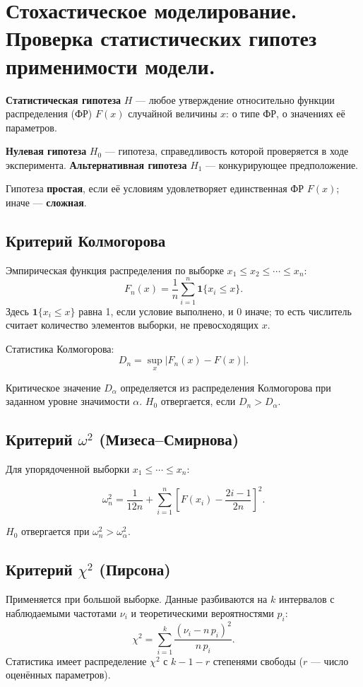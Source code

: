 \section{Стохастическое моделирование. Проверка статистических гипотез применимости модели.}

\textbf{Статистическая гипотеза} $H$ — любое утверждение относительно функции распределения (ФР) $F(x)$ случайной величины $x$: о типе ФР, о значениях её параметров.

\textbf{Нулевая гипотеза} $H_0$ — гипотеза, справедливость которой проверяется в ходе эксперимента.
\textbf{Альтернативная гипотеза} $H_1$ — конкурирующее предположение.

Гипотеза \textbf{простая}, если её условиям удовлетворяет единственная ФР $F(x)$; иначе — \textbf{сложная}.

\subsection*{Критерий Колмогорова}

Эмпирическая функция распределения по выборке $x_1 \leqslant x_2 \leqslant \cdots \leqslant x_n$:
\[
  F_n(x) = \frac{1}{n}\sum_{i=1}^n \mathbf{1}\{x_i \leqslant x\}.
\]
Здесь $\mathbf{1}\{x_i \leqslant x\}$ равна 1, если условие выполнено, и 0 иначе; то есть числитель считает количество элементов выборки, не превосходящих $x$.

Статистика Колмогорова:
\[
  D_n = \sup_x \bigl|F_n(x) - F(x)\bigr|.
\]

Критическое значение $D_\alpha$ определяется из распределения Колмогорова при заданном уровне значимости $\alpha$. $H_0$ отвергается, если $D_n > D_\alpha$.

\subsection*{Критерий $\omega^2$ (Мизеса–Смирнова)}

Для упорядоченной выборки $x_1 \leqslant \cdots \leqslant x_n$:

\[
  \omega^2_n = \frac{1}{12n} + \sum_{i=1}^n \left[F(x_i) - \frac{2i-1}{2n}\right]^2.
\]

$H_0$ отвергается при $\omega^2_n > \omega^2_\alpha$.

\subsection*{Критерий $\chi^2$ (Пирсона)}

Применяется при большой выборке. Данные разбиваются на $k$ интервалов с наблюдаемыми частотами $\nu_i$ и теоретическими вероятностями $p_i$:
\[
  \chi^2 = \sum_{i=1}^k \frac{(\nu_i - n\,p_i)^2}{n\,p_i}.
\]
Статистика имеет распределение $\chi^2$ с $k - 1 - r$ степенями свободы ($r$ — число оценённых параметров).

\clearpage

